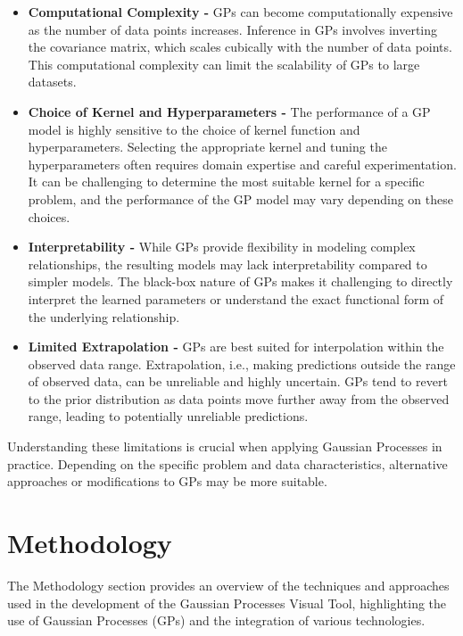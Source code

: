 \documentclass[preprint,journal]{vgtc}       %
\begin{document}
\begin{itemize}
  \item \textbf{Computational Complexity -} GPs can become computationally expensive as the number of data points increases. Inference in GPs involves inverting the covariance matrix, which scales cubically with the number of data points. This computational complexity can limit the scalability of GPs to large datasets.

  \item \textbf{Choice of Kernel and Hyperparameters -} The performance of a GP model is highly sensitive to the choice of kernel function and hyperparameters. Selecting the appropriate kernel and tuning the hyperparameters often requires domain expertise and careful experimentation. It can be challenging to determine the most suitable kernel for a specific problem, and the performance of the GP model may vary depending on these choices.

  \item \textbf{Interpretability -} While GPs provide flexibility in modeling complex relationships, the resulting models may lack interpretability compared to simpler models. The black-box nature of GPs makes it challenging to directly interpret the learned parameters or understand the exact functional form of the underlying relationship.

  \item \textbf{Limited Extrapolation -} GPs are best suited for interpolation within the observed data range. Extrapolation, i.e., making predictions outside the range of observed data, can be unreliable and highly uncertain. GPs tend to revert to the prior distribution as data points move further away from the observed range, leading to potentially unreliable predictions.

  \end{itemize}

Understanding these limitations is crucial when applying Gaussian Processes in practice. Depending on the specific problem and data characteristics, alternative approaches or modifications to GPs may be more suitable.

\section{Methodology}

The Methodology section provides an overview of the techniques and approaches used in the development of the Gaussian Processes Visual Tool, highlighting the use of Gaussian Processes (GPs) and the integration of various technologies.
\end{document}
